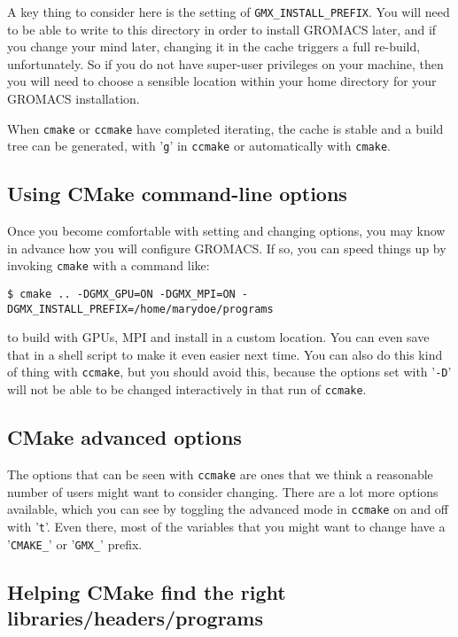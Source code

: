 \documentclass{article}[12pt,a4paper,twoside]
\newcommand{\gromacs}{GROMACS}
\begin{document}
A key thing to consider here is the setting of
\texttt{GMX\_INSTALL\_PREFIX}. You will need to be able to write to this
directory in order to install \gromacs{} later, and if you change your
mind later, changing it in the cache triggers a full re-build,
unfortunately. So if you do not have super-user privileges on your
machine, then you will need to choose a sensible location within your
home directory for your \gromacs{} installation.

When \texttt{cmake} or \texttt{ccmake} have completed iterating, the
cache is stable and a build tree can be generated, with '\verb+g+' in
\texttt{ccmake} or automatically with \texttt{cmake}.

\subsection{Using CMake command-line options}
Once you become comfortable with setting and changing options, you
may know in advance how you will configure GROMACS. If so, you can
speed things up by invoking \texttt{cmake} with a command like:
\begin{verbatim}
$ cmake .. -DGMX_GPU=ON -DGMX_MPI=ON -DGMX_INSTALL_PREFIX=/home/marydoe/programs
\end{verbatim}
to build with GPUs, MPI and install in a custom location. You can even
save that in a shell script to make it even easier next time. You can
also do this kind of thing with \texttt{ccmake}, but you should avoid
this, because the options set with '\verb+-D+' will not be able to be
changed interactively in that run of \texttt{ccmake}.

\subsection{CMake advanced options}
The options that can be seen with \texttt{ccmake} are ones that we
think a reasonable number of users might want to consider
changing. There are a lot more options available, which you can see by
toggling the advanced mode in \texttt{ccmake} on and off with
'\verb+t+'. Even there, most of the variables that you might want to
change have a '\verb+CMAKE_+' or '\verb+GMX_+' prefix.

\subsection{Helping CMake find the right libraries/headers/programs}
\end{document}
